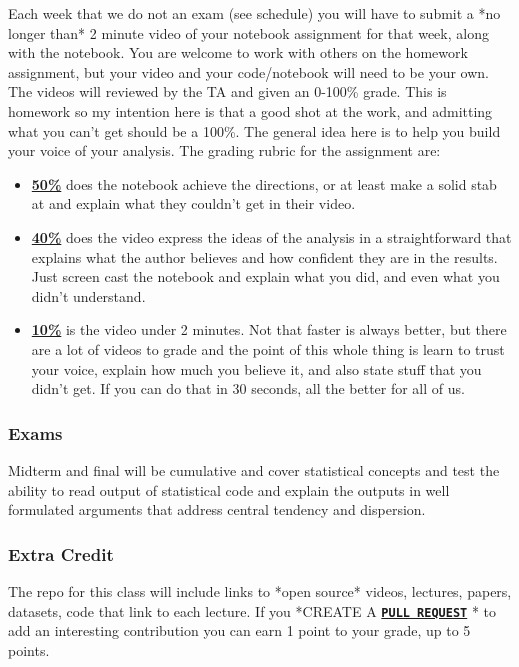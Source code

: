 \documentclass[11pt]{article}
\begin{document}
Each week that we do not an exam (see schedule) you will have to submit a *no longer than* 2 minute video of your notebook assignment for that week, along with the notebook. You are welcome to work with others on the homework assignment, but your video and your code/notebook will need to be your own. The videos will reviewed by the TA and given an 0-100\% grade. This is homework so my intention here is that a good shot at the work, and admitting what you can't get should be a 100\%. The general idea here is to help you build your voice of your analysis. The grading rubric for the assignment are:
  \begin{itemize}
\item \underline{\textbf{50\%}} does the notebook achieve the directions, or at least make a solid stab at and explain what they couldn't get in their video.  
	\item \underline{\textbf{40\%}} does the video express the ideas of the analysis in a straightforward that explains what the author believes and how confident they are in the results. Just screen cast the notebook and explain what you did, and even what you didn't understand. 
\item \underline{\textbf{10\%}} is the video under 2 minutes. Not that faster is always better, but there are a lot of videos to grade and the point of this whole thing is learn to trust your voice, explain how much you believe it, and also state stuff that you didn't get. If you can do that in 30 seconds, all the better for all of us.   
\end{itemize}

\subsubsection*{Exams}
Midterm and final will be cumulative and cover statistical concepts and test the ability to read output of statistical code and explain the outputs in well formulated arguments that address central tendency and dispersion.


\subsubsection*{Extra Credit}
The repo for this class will include links to *open source* videos, lectures, papers, datasets, code that link to each lecture. If you *CREATE A \href{https://docs.github.com/en/pull-requests/collaborating-with-pull-requests/proposing-changes-to-your-work-with-pull-requests/creating-a-pull-request}{\tt\bf  PULL REQUEST} * to add an interesting contribution you can earn 1 point to your grade, up to 5 points.
\end{document}
